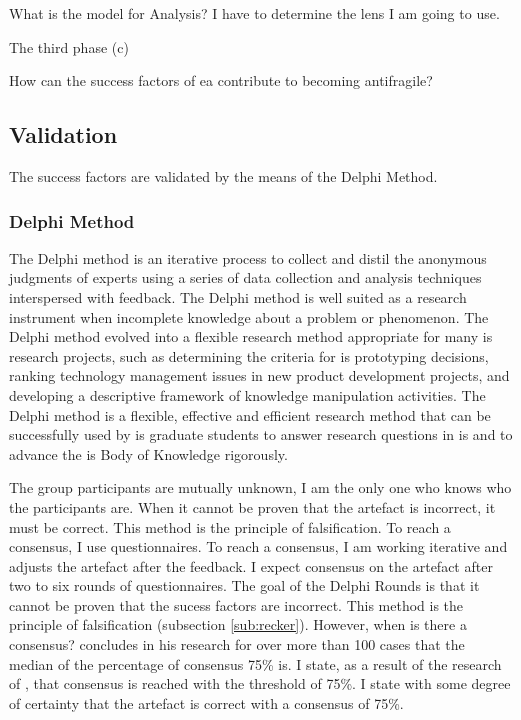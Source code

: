 \begin{remark}
	What is the model for Analysis?
	I have to determine the lens I am going to use.
\end{remark}

The third phase (c)

How can the success factors of \acrlong{ea} contribute to becoming antifragile?

\subsection{Validation}
\label{sub:validatinphase}
The success factors are validated by the means of the Delphi Method.

\subsubsection{Delphi Method}
\label{subsub:delphimethod}
The Delphi method is an iterative process to collect and distil the anonymous judgments of experts using a series of data collection and analysis techniques interspersed with feedback. The Delphi method is well suited as a research instrument when incomplete knowledge about a problem or phenomenon. The Delphi method evolved into a flexible research method appropriate for many \acrfull{is} research projects, such as determining the criteria for \acrshort{is} prototyping decisions, ranking technology management issues in new product development projects, and developing a descriptive framework of knowledge manipulation
activities. The Delphi method is a flexible, effective and efficient research method that can be successfully used by \acrshort{is} graduate students to answer research questions in \acrshort{is} and to advance the \acrshort{is} Body of Knowledge rigorously. \parencite{Skulmoski2007}

The group participants are mutually unknown, I am the only one who knows who the participants are. When it cannot be proven that the artefact is incorrect, it must be correct. This method is the principle of falsification. To reach a consensus, I use questionnaires. To reach a consensus, I am working iterative and adjusts the artefact after the feedback. I expect consensus on the artefact after two to six rounds of questionnaires. The goal of the Delphi Rounds is that it cannot be proven that the sucess factors are incorrect. This method is the principle of falsification (subsection \ref{sub:recker}). However, when is there a consensus? \textcite[p. 404]{Diamond2014} concludes in his research for over more than 100 cases that the median of the percentage of consensus 75\% is. I state, as a result of the research of \textcite{Diamond2014}, that consensus is reached with the threshold of 75\%. I state with some degree of certainty that the artefact is correct with a consensus of 75\%.

